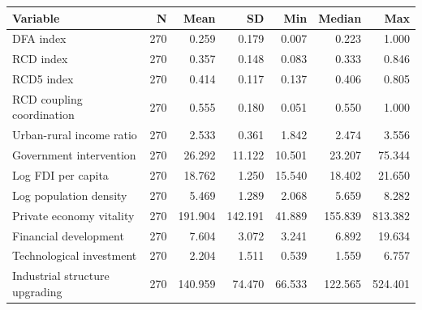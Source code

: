 \begin{tabular}{lrrrrrr}
\toprule
Variable & N & Mean & SD & Min & Median & Max \\
\midrule
DFA index & 270 & 0.259 & 0.179 & 0.007 & 0.223 & 1.000 \\
RCD index & 270 & 0.357 & 0.148 & 0.083 & 0.333 & 0.846 \\
RCD5 index & 270 & 0.414 & 0.117 & 0.137 & 0.406 & 0.805 \\
RCD coupling coordination & 270 & 0.555 & 0.180 & 0.051 & 0.550 & 1.000 \\
Urban-rural income ratio & 270 & 2.533 & 0.361 & 1.842 & 2.474 & 3.556 \\
Government intervention & 270 & 26.292 & 11.122 & 10.501 & 23.207 & 75.344 \\
Log FDI per capita & 270 & 18.762 & 1.250 & 15.540 & 18.402 & 21.650 \\
Log population density & 270 & 5.469 & 1.289 & 2.068 & 5.659 & 8.282 \\
Private economy vitality & 270 & 191.904 & 142.191 & 41.889 & 155.839 & 813.382 \\
Financial development & 270 & 7.604 & 3.072 & 3.241 & 6.892 & 19.634 \\
Technological investment & 270 & 2.204 & 1.511 & 0.539 & 1.559 & 6.757 \\
Industrial structure upgrading & 270 & 140.959 & 74.470 & 66.533 & 122.565 & 524.401 \\
\bottomrule
\end{tabular}